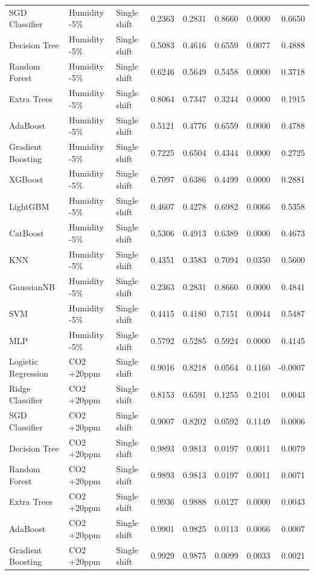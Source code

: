 \begin{tabular}{lllrrrrr}
SGD Classifier & Humidity -5\% & Single shift & 0.2363 & 0.2831 & 0.8660 & 0.0000 & 0.6650 \\
Decision Tree & Humidity -5\% & Single shift & 0.5083 & 0.4616 & 0.6559 & 0.0077 & 0.4888 \\
Random Forest & Humidity -5\% & Single shift & 0.6246 & 0.5649 & 0.5458 & 0.0000 & 0.3718 \\
Extra Trees & Humidity -5\% & Single shift & 0.8064 & 0.7347 & 0.3244 & 0.0000 & 0.1915 \\
AdaBoost & Humidity -5\% & Single shift & 0.5121 & 0.4776 & 0.6559 & 0.0000 & 0.4788 \\
Gradient Boosting & Humidity -5\% & Single shift & 0.7225 & 0.6504 & 0.4344 & 0.0000 & 0.2725 \\
XGBoost & Humidity -5\% & Single shift & 0.7097 & 0.6386 & 0.4499 & 0.0000 & 0.2881 \\
LightGBM & Humidity -5\% & Single shift & 0.4607 & 0.4278 & 0.6982 & 0.0066 & 0.5358 \\
CatBoost & Humidity -5\% & Single shift & 0.5306 & 0.4913 & 0.6389 & 0.0000 & 0.4673 \\
KNN & Humidity -5\% & Single shift & 0.4351 & 0.3583 & 0.7094 & 0.0350 & 0.5600 \\
GaussianNB & Humidity -5\% & Single shift & 0.2363 & 0.2831 & 0.8660 & 0.0000 & 0.4841 \\
SVM & Humidity -5\% & Single shift & 0.4415 & 0.4180 & 0.7151 & 0.0044 & 0.5487 \\
MLP & Humidity -5\% & Single shift & 0.5792 & 0.5285 & 0.5924 & 0.0000 & 0.4145 \\
Logistic Regression & CO2 +20ppm & Single shift & 0.9016 & 0.8218 & 0.0564 & 0.1160 & -0.0007 \\
Ridge Classifier & CO2 +20ppm & Single shift & 0.8153 & 0.6591 & 0.1255 & 0.2101 & 0.0043 \\
SGD Classifier & CO2 +20ppm & Single shift & 0.9007 & 0.8202 & 0.0592 & 0.1149 & 0.0006 \\
Decision Tree & CO2 +20ppm & Single shift & 0.9893 & 0.9813 & 0.0197 & 0.0011 & 0.0079 \\
Random Forest & CO2 +20ppm & Single shift & 0.9893 & 0.9813 & 0.0197 & 0.0011 & 0.0071 \\
Extra Trees & CO2 +20ppm & Single shift & 0.9936 & 0.9888 & 0.0127 & 0.0000 & 0.0043 \\
AdaBoost & CO2 +20ppm & Single shift & 0.9901 & 0.9825 & 0.0113 & 0.0066 & 0.0007 \\
Gradient Boosting & CO2 +20ppm & Single shift & 0.9929 & 0.9875 & 0.0099 & 0.0033 & 0.0021 \\

\end{tabular}
